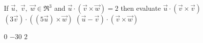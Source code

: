 
\begin{Exercise}[
name={},
title={}, 
difficulty=0,
origin={\cite{YL}}]
If $\vec{u},\;\vec{v},\;\vec{w}\in\Re^3$ and $\vec{u}\cdot(\vec{v}\times\vec{w})=2$ then evaluate
\Question $\vec{u}\cdot(\vec{v}\times\vec{v})$
\Question $(3\vec{v})\cdot((5\vec{u})\times\vec{w})$
\Question $(\vec{u}-\vec{v})\cdot(\vec{v}\times\vec{w})$
\end{Exercise}

\begin{Answer}
\Question $0$
\Question $-30$
\Question $2$
\end{Answer}

